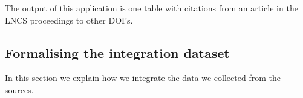 \documentclass{ou-report}
\newcommand{\doi}{{DOI}}
\newcommand{\lncs}{LNCS}
\newcommand{\dblp}{DBLP}
\begin{document}
The output of this application is one table with citations from an article in 
the \lncs{} proceedings to other \doi{}'s.


\subsection{Formalising the integration dataset}
In this section we explain how we integrate the data we collected from the 
sources.




\end{document}
